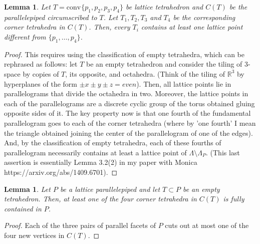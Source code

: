 \documentclass{amsart}
\theoremstyle{plain}
\newtheorem{lemma}[theorem]{Lemma}
\theoremstyle{definition}
\newcommand{\R}{ \ensuremath{\mathbb{R}}}
\newcommand{\conv}{\ensuremath{\mathrm{conv}}\hspace{1pt}}
\newcommand{\paco}[1]{\todo[size=\tiny,color=green!30]{#1 \\ \hfill --- P.}}
\begin{document}
\begin{lemma}
\label{lemma:corner}
Let $T=\conv\{p_1,p_2,p_3,p_4\}$ be lattice tetrahedron and $C(T)$ be the parallelepiped circumscribed to $T$. Let $T_1, T_2,T_3$ and $T_4$ be the corresponding corner tetrahedra in $C(T)$. Then, every $T_i$ contains at least one lattice point different from $\{p_1,\dots,p_4\}$.
\end{lemma}

\begin{proof}
%
This requires using the classification of empty tetrahedra, which can be rephrased as follows: let $T$ be an empty tetrahedron and consider the tiling of 3-space by copies of $T$, its opposite, and octahedra. (Think of the tiling of $\R^3$ by hyperplanes of the form $\pm x \pm y \pm z = even$). Then, all lattice points lie in parallelograms that divide the octahedra in two. Moreover, the lattice points in each of the parallelograms are a discrete cyclic group of the torus obtained gluing opposite sides of it. The key property now is that one fourth of the fundamental parallelogram goes to each of the corner tetrahedra (where by 'one fourth' I mean the triangle obtained joining the center of the parallelogram of one of the edges). And, by the classification of empty tetrahedra, each of these fourths of parallelogram necessarily contains at least a lattice point of $\Lambda \setminus \Lambda_P$. (This last assertion is essentially Lemma 3.2(2) in my paper with Monica https://arxiv.org/abs/1409.6701).
\end{proof}


\begin{lemma}
\label{lemma:3<4}
Let $P$ be a lattice parallelepiped and let $T\subset P$ be an empty tetrahedron. Then, at least one of the four corner tetrahedra in $C(T)$ is fully contained in $P$.
\end{lemma}

\begin{proof}
\paco{fill in details...}
Each of the three pairs of parallel facets of $P$ cuts out at most one of the four new vertices in $C(T)$.
\end{proof}
\end{document}
